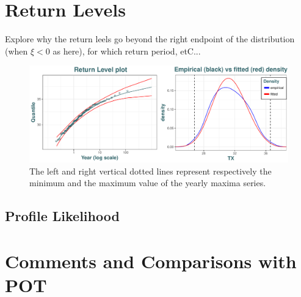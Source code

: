 \section{Return Levels}

Explore why the return leels go beyond the right endpoint of the distribution (when $\xi<0$ as here), for which return period, etC...

\begin{figure}[!htb]
\centering	\includegraphics[width=.75\linewidth]{rl_empdes.pdf}\caption{ The left and right vertical dotted lines represent respectively the minimum and the maximum value of the yearly maxima series.}\label{fig:rl_empdes}
\end{figure}


\subsection{Profile Likelihood}



\section{Comments and Comparisons with POT}
